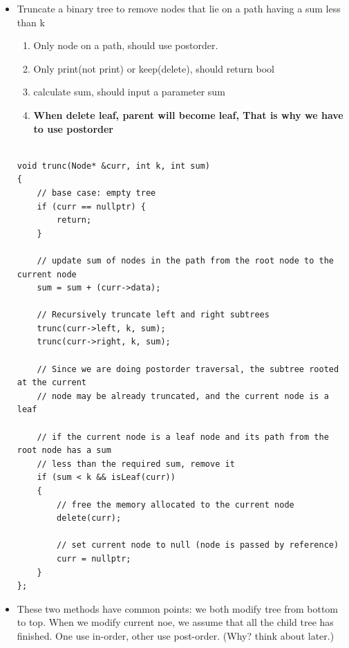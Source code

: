 \documentclass[a4paper,11pt,twoside]{book}
\begin{document}
\begin{itemize}
\item Truncate a binary tree to remove nodes that lie on a path having a sum less than k
\begin{enumerate}
	\item Only node on a path, should use postorder. 
	\item Only print(not print) or keep(delete), should return bool
	\item calculate sum, should input a parameter sum
	\item \textbf{When delete leaf, parent will become leaf, That is why we have to use postorder}
\end{enumerate}
\begin{lstlisting}
	
void trunc(Node* &curr, int k, int sum)
{
	// base case: empty tree
	if (curr == nullptr) {
		return;
	}
	
	// update sum of nodes in the path from the root node to the current node
	sum = sum + (curr->data);
	
	// Recursively truncate left and right subtrees
	trunc(curr->left, k, sum);
	trunc(curr->right, k, sum);
	
	// Since we are doing postorder traversal, the subtree rooted at the current
	// node may be already truncated, and the current node is a leaf
	
	// if the current node is a leaf node and its path from the root node has a sum
	// less than the required sum, remove it
	if (sum < k && isLeaf(curr))
	{
		// free the memory allocated to the current node
		delete(curr);
		
		// set current node to null (node is passed by reference)
		curr = nullptr;
	}
};
\end{lstlisting}

\item These two methods have common points: we both modify tree from bottom to top. When we modify current noe, we assume that all the child tree has finished. One use in-order, other use post-order. (Why? think about later.)


\end{itemize}
\end{document}
